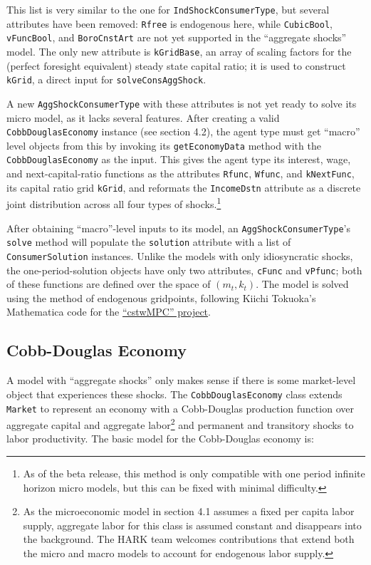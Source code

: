 \documentclass[12pt,titlepage,letterpaper]{econtex}
\begin{document}
This list is very similar to the one for \texttt{IndShockConsumerType}, but several attributes have been removed: \texttt{Rfree} is endogenous here, while \texttt{CubicBool}, \texttt{vFuncBool}, and \texttt{BoroCnstArt} are not yet supported in the ``aggregate shocks'' model.  The only new attribute is \texttt{kGridBase}, an array of scaling factors for the (perfect foresight equivalent) steady state capital ratio; it is used to construct \texttt{kGrid}, a direct input for \texttt{solveConsAggShock}.

A new \texttt{AggShockConsumerType} with these attributes is not yet ready to solve its micro model, as it lacks several features.  After creating a valid \texttt{CobbDouglasEconomy} instance (see section 4.2), the agent type must get ``macro'' level objects from this by invoking its \texttt{getEconomyData} method with the \texttt{CobbDouglasEconomy} as the input.  This gives the agent type its interest, wage, and next-capital-ratio functions as the attributes \texttt{Rfunc}, \texttt{Wfunc}, and \texttt{kNextFunc}, its capital ratio grid \texttt{kGrid}, and reformats the \texttt{IncomeDstn} attribute as a discrete joint distribution across all four types of shocks.\footnote{As of the beta release, this method is only compatible with one period infinite horizon micro models, but this can be fixed with minimal difficulty.}

After obtaining ``macro''-level inputs to its model, an \texttt{AggShockConsumerType}'s \texttt{solve} method will populate the \texttt{solution} attribute with a list of \texttt{ConsumerSolution} instances.  Unlike the models with only idiosyncratic shocks, the one-period-solution objects have only two attributes, \texttt{cFunc} and \texttt{vPfunc}; both of these functions are defined over the space of $(m_t,k_t)$.  The model is solved using the method of endogenous gridpoints, following Kiichi Tokuoka's Mathematica code for the \href{http://www.econ2.jhu.edu/people/ccarroll/papers/cstwMPC/}{``cstwMPC'' project}.

\subsection{Cobb-Douglas Economy}

A model with ``aggregate shocks'' only makes sense if there is some market-level object that experiences these shocks.  The \texttt{CobbDouglasEconomy} class extends \texttt{Market} to represent an economy with a Cobb-Douglas production function over aggregate capital and aggregate labor\footnote{As the microeconomic model in section 4.1 assumes a fixed per capita labor supply, aggregate labor for this class is assumed constant and disappears into the background.  The HARK team welcomes contributions that extend both the micro and macro models to account for endogenous labor supply.} and permanent and transitory shocks to labor productivity.  The basic model for the Cobb-Douglas economy is:
\end{document}
